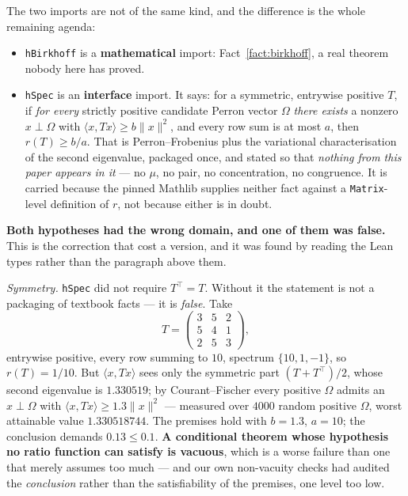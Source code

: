 \documentclass[11pt,a4paper]{article}
\theoremstyle{plain}
\theoremstyle{definition}
\begin{document}
The two imports are not of the same kind, and the difference is the whole
remaining agenda:

\begin{itemize}
\item \verb|hBirkhoff| is a \textbf{mathematical} import: Fact~\ref{fact:birkhoff},
  a real theorem nobody here has proved.
\item \verb|hSpec| is an \textbf{interface} import. It says: for a symmetric,
  entrywise positive $T$, if \emph{for every} strictly positive candidate Perron
  vector $\Omega$ \emph{there exists} a nonzero $x\perp\Omega$ with
  $\langle x,Tx\rangle\ge b\|x\|^2$, and every row sum is at most $a$, then
  $r(T)\ge b/a$. That is Perron--Frobenius plus the variational characterisation
  of the second eigenvalue, packaged once, and stated so that \emph{nothing from
  this paper appears in it} --- no $\mu$, no pair, no concentration, no
  congruence. It is carried because the pinned Mathlib supplies neither fact
  against a \texttt{Matrix}-level definition of $r$, not because either is in
  doubt.
\end{itemize}

\textbf{Both hypotheses had the wrong domain, and one of them was false.} This
is the correction that cost a version, and it was found by reading the Lean
types rather than the paragraph above them.

\emph{Symmetry.} \verb|hSpec| did not require $T^{\!\top}=T$. Without it the
statement is not a packaging of textbook facts --- it is \emph{false}. Take
\[
  T=\begin{pmatrix}3&5&2\\ 5&4&1\\ 2&5&3\end{pmatrix},
\]
entrywise positive, every row summing to $10$, spectrum $\{10,1,-1\}$, so
$r(T)=1/10$. But $\langle x,Tx\rangle$ sees only the symmetric part
$(T+T^{\!\top})/2$, whose second eigenvalue is $1.330519$; by Courant--Fischer
every positive $\Omega$ admits an $x\perp\Omega$ with
$\langle x,Tx\rangle\ge 1.3\|x\|^2$ --- measured over $4000$ random positive
$\Omega$, worst attainable value $1.330518744$. The premises hold with $b=1.3$,
$a=10$; the conclusion demands $0.13\le 0.1$. \textbf{A conditional theorem whose
hypothesis no ratio function can satisfy is vacuous}, which is a worse failure
than one that merely assumes too much --- and our own non-vacuity checks had
audited the \emph{conclusion} rather than the satisfiability of the premises,
one level too low.
\end{document}
